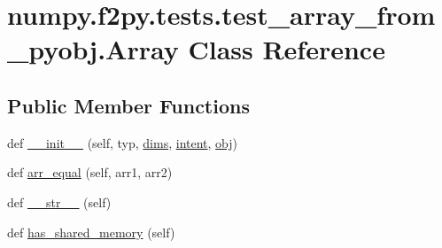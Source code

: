 \hypertarget{classnumpy_1_1f2py_1_1tests_1_1test__array__from__pyobj_1_1Array}{}\section{numpy.\+f2py.\+tests.\+test\+\_\+array\+\_\+from\+\_\+pyobj.\+Array Class Reference}
\label{classnumpy_1_1f2py_1_1tests_1_1test__array__from__pyobj_1_1Array}
\subsection*{Public Member Functions}
\begin{DoxyCompactItemize}
\item 
def \hyperlink{classnumpy_1_1f2py_1_1tests_1_1test__array__from__pyobj_1_1Array_a0ede537d64a7119d83be5d4f65207cfb}{\+\_\+\+\_\+init\+\_\+\+\_\+} (self, typ, \hyperlink{classnumpy_1_1f2py_1_1tests_1_1test__array__from__pyobj_1_1Array_a230940fbf08c704899d614ff5d32124d}{dims}, \hyperlink{classnumpy_1_1f2py_1_1tests_1_1test__array__from__pyobj_1_1Array_a98409f57ba6dd18e664ee1f96e217006}{intent}, \hyperlink{classnumpy_1_1f2py_1_1tests_1_1test__array__from__pyobj_1_1Array_a346a63862c3845a41e9bea185c736573}{obj})
\item 
def \hyperlink{classnumpy_1_1f2py_1_1tests_1_1test__array__from__pyobj_1_1Array_a34fed84aa2f3a3cd0f90d46731f1c723}{arr\+\_\+equal} (self, arr1, arr2)
\item 
def \hyperlink{classnumpy_1_1f2py_1_1tests_1_1test__array__from__pyobj_1_1Array_abe982c7495c45e41469421407aa6d0db}{\+\_\+\+\_\+str\+\_\+\+\_\+} (self)
\item 
def \hyperlink{classnumpy_1_1f2py_1_1tests_1_1test__array__from__pyobj_1_1Array_a14a9f97987a3c513d330b96eefc3def6}{has\+\_\+shared\+\_\+memory} (self)
\end{DoxyCompactItemize}
